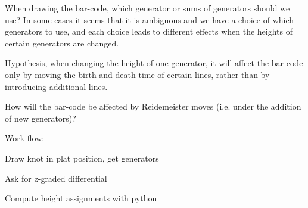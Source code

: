 \documentclass[11pt]{amsart}
\begin{document}
When drawing the bar-code, which generator or sums of generators should we use? In some cases it seems that it is ambiguous and we have a choice of which generators to use, and each choice leads to different effects when the heights of certain generators are changed.

Hypothesis, when changing the height of one generator, it will affect the bar-code only by moving the birth and death time of certain lines, rather than by introducing additional lines.

How will the bar-code be affected by Reidemeister moves (i.e. under the addition of new generators)?

Work flow:



Draw knot in plat position, get generators

Ask for z-graded differential

Compute height assignments with python
\end{document}
